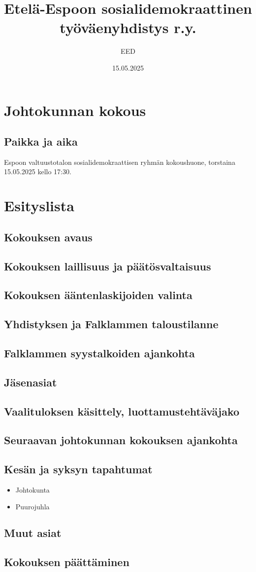 \documentclass[a4paper,12pt]{article}
\title{Etelä-Espoon sosialidemokraattinen työväenyhdistys r.y.}
\author{EED}
\date{15.05.2025}
\begin{document}
\maketitle
\tableofcontents
\section*{Johtokunnan kokous}
\subsection*{Paikka ja aika}
Espoon valtuustotalon sosialidemokraattisen ryhmän kokoushuone, torstaina 15.05.2025 kello 17:30.
\section*{Esityslista}
\subsection{Kokouksen avaus}
\subsection{Kokouksen laillisuus ja päätösvaltaisuus}
\subsection{Kokouksen ääntenlaskijoiden valinta}
\subsection{Yhdistyksen ja Falklammen taloustilanne}
\subsection{Falklammen syystalkoiden ajankohta}
\subsection{Jäsenasiat}
\subsection{Vaalituloksen käsittely, luottamustehtäväjako}
\subsection{Seuraavan johtokunnan kokouksen ajankohta}
\subsection{Kesän ja syksyn tapahtumat}
\begin{itemize}
\item{Johtokunta}
\item{Puurojuhla}
\end{itemize}
\subsection{Muut asiat}
\subsection{Kokouksen päättäminen}
\end{document}
